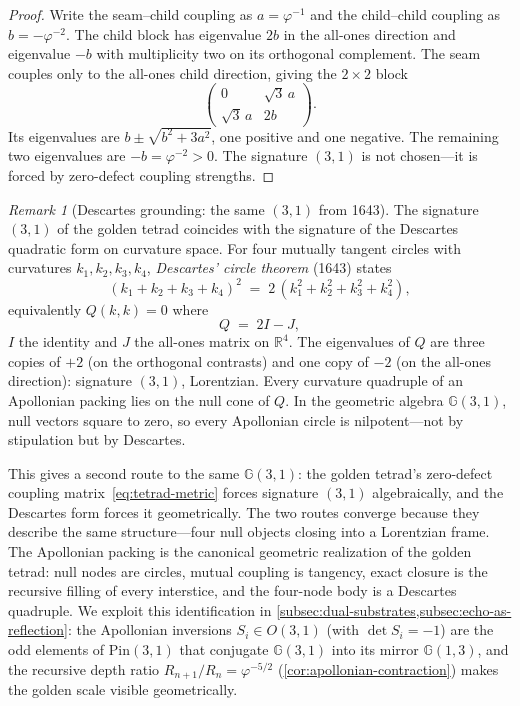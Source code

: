 \documentclass[11pt,a4paper]{article}
\theoremstyle{plain}
\theoremstyle{definition}
\theoremstyle{remark}
\newtheorem{remark}[theorem]{Remark}
\numberwithin{equation}{section}
\newcommand{\Cl}{\mathbb{G}}
\newcommand{\vp}{\varphi}
\begin{document}
\begin{proof}
Write the seam--child coupling as \(a=\vp^{-1}\) and the child--child
coupling as \(b=-\vp^{-2}\).  The child block has eigenvalue \(2b\) in
the all-ones direction and eigenvalue \(-b\) with multiplicity two on
its orthogonal complement.  The seam couples only to the all-ones child
direction, giving the \(2\times2\) block
\[
  \begin{pmatrix}0&\sqrt3\,a\\ \sqrt3\,a&2b\end{pmatrix}.
\]
Its eigenvalues are \(b\pm\sqrt{b^2+3a^2}\), one positive and one
negative.  The remaining two eigenvalues are \(-b=\vp^{-2}>0\).
The signature \((3,1)\) is not chosen---it is forced by zero-defect
coupling strengths.
\end{proof}

\begin{remark}[Descartes grounding: the same \((3,1)\) from 1643]
\label{rmk:descartes-grounding}
The signature \((3,1)\) of the golden tetrad coincides with the
signature of the Descartes quadratic form on curvature space.  For four
mutually tangent circles with curvatures \(k_1,k_2,k_3,k_4\),
\emph{Descartes' circle theorem} (1643) states
\[
  (k_1+k_2+k_3+k_4)^2 \;=\; 2\,(k_1^2+k_2^2+k_3^2+k_4^2),
\]
equivalently \(Q(k,k)=0\) where
\[
  Q \;=\; 2I-J,
\]
\(I\) the identity and \(J\) the all-ones matrix on \(\mathbb{R}^4\).
The eigenvalues of \(Q\) are three copies of \(+2\) (on the orthogonal
contrasts) and one copy of \(-2\) (on the all-ones direction): signature
\((3,1)\), Lorentzian.  Every curvature quadruple of an Apollonian
packing lies on the null cone of \(Q\).  In the geometric algebra
\(\Cl(3,1)\), null vectors square to zero, so every Apollonian circle
is nilpotent---not by stipulation but by Descartes.

\smallskip
This gives a second route to the same \(\Cl(3,1)\): the golden tetrad's
zero-defect coupling matrix~\eqref{eq:tetrad-metric} forces signature
\((3,1)\) algebraically, and the Descartes form forces it geometrically.
The two routes converge because they describe the same structure---four
null objects closing into a Lorentzian frame.  The Apollonian packing is
the canonical geometric realization of the golden tetrad: null nodes are
circles, mutual coupling is tangency, exact closure is the recursive
filling of every interstice, and the four-node body is a Descartes
quadruple.  We exploit this identification in
\cref{subsec:dual-substrates,subsec:echo-as-reflection}: the Apollonian
inversions \(S_i\in O(3,1)\) (with \(\det S_i=-1\)) are the odd elements
of \(\mathrm{Pin}(3,1)\) that conjugate \(\Cl(3,1)\) into its mirror
\(\Cl(1,3)\), and the recursive depth ratio \(R_{n+1}/R_n=\vp^{-5/2}\)
(\cref{cor:apollonian-contraction}) makes the golden scale visible
geometrically.
\end{remark}
\end{document}
